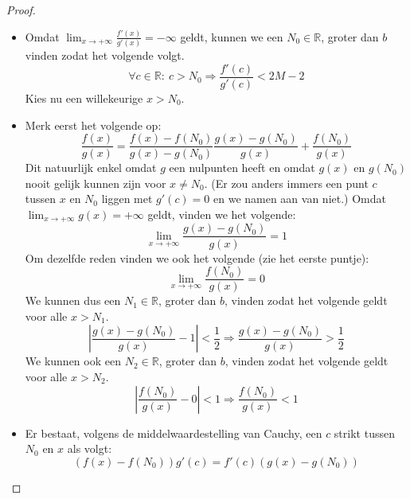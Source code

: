 \documentclass[main.tex]{subfiles}
\begin{document}
\begin{st}
\begin{proof}
\begin{itemize}
\begin{itemize}
      \item Omdat $\lim_{x \rightarrow +\infty}\frac{f'(x)}{g'(x)} = -\infty$ geldt, kunnen we een $N_{0} \in \mathbb{R}$, groter dan $b$ vinden zodat het volgende volgt.
        \[ \forall c\in \mathbb{R}:\ c > N_{0} \Rightarrow \frac{f'(c)}{g'(c)} < 2M-2 \]
        Kies nu een willekeurige $x > N_{0}$.
        \begin{figure}[H]
          \centering
        \end{figure}
      \item 
        Merk eerst het volgende op:
        \[ \frac{f(x)}{g(x)} = \frac{f(x)-f(N_{0})}{g(x)-g(N_{0})}  \frac{g(x)-g(N_{0})}{g(x)} + \frac{f(N_{0})}{g(x)} \]
        Dit natuurlijk enkel omdat $g$ een nulpunten heeft en omdat $g(x)$ en $g(N_{0})$ nooit gelijk kunnen zijn voor $x \neq N_{0}$.
        (Er zou anders immers een punt $c$ tussen $x$ en $N_{0}$ liggen met $g'(c) =0$ en we namen aan van niet.)
        Omdat $\lim_{x\rightarrow +\infty}g(x) = +\infty$ geldt, vinden we het volgende:
        \[ \lim_{x\rightarrow +\infty}\frac{g(x)-g(N_{0})}{g(x)} = 1\]
        Om dezelfde reden vinden we ook het volgende (zie het eerste puntje):
        \[ \lim_{x\rightarrow +\infty}\frac{f(N_{0})}{g(x)} = 0 \]
        We kunnen dus een $N_{1}\in \mathbb{R}$, groter dan $b$, vinden zodat het volgende geldt voor alle $x>N_{1}$.
        \[ \left| \frac{g(x)-g(N_{0})}{g(x)} -1 \right| < \frac{1}{2}  \Rightarrow \frac{g(x)-g(N_{0})}{g(x)} > \frac{1}{2} \]
        We kunnen ook een $N_{2}\in \mathbb{R}$, groter dan $b$, vinden zodat het volgende geldt voor alle $x>N_{2}$.
        \[ \left| \frac{f(N_{0})}{g(x)} -0 \right| < 1 \Rightarrow \frac{f(N_{0})}{g(x)} < 1 \]
      \item 
        Er bestaat, volgens de middelwaardestelling van Cauchy, een $c$ strikt tussen $N_{0}$ en $x$ als volgt:
        \[ \left( f(x) - f(N_{0}) \right) g'(c) = f'(c) \left( g(x) - g(N_{0}) \right) \]

\end{itemize}
\end{itemize}
\end{proof}
\end{st}
\end{document}
